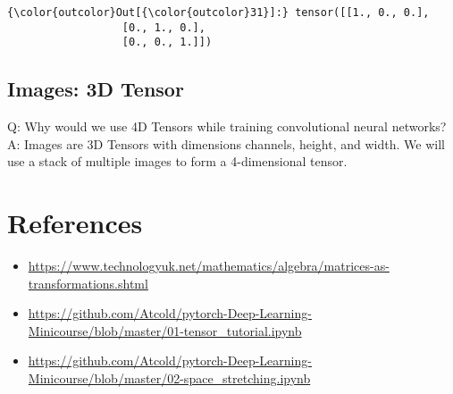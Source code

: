 \begin{Verbatim}[commandchars=\\\{\}]
{\color{outcolor}Out[{\color{outcolor}31}]:} tensor([[1., 0., 0.],
                  [0., 1., 0.],
                  [0., 0., 1.]])
\end{Verbatim}
\subsection{Images: 3D Tensor}
Q: Why would we use 4D Tensors while training convolutional neural networks?\\
A: Images are 3D Tensors with dimensions channels, height, and width. We will use a stack of multiple images to form a 4-dimensional tensor.


\section{References}
\begin{itemize}
\tightlist
\item
\href{https://www.technologyuk.net/mathematics/algebra/matrices-as-transformations.shtml}{https://www.technologyuk.net/mathematics/algebra/matrices-as-transformations.shtml}
\item
\href{https://github.com/Atcold/pytorch-Deep-Learning-Minicourse/blob/master/01-tensor_tutorial.ipynb}{https://github.com/Atcold/pytorch-Deep-Learning-Minicourse/blob/master/01-tensor_tutorial.ipynb}
\item
\href{https://github.com/Atcold/pytorch-Deep-Learning-Minicourse/blob/master/02-space_stretching.ipynb}{https://github.com/Atcold/pytorch-Deep-Learning-Minicourse/blob/master/02-space_stretching.ipynb}
\end{itemize}